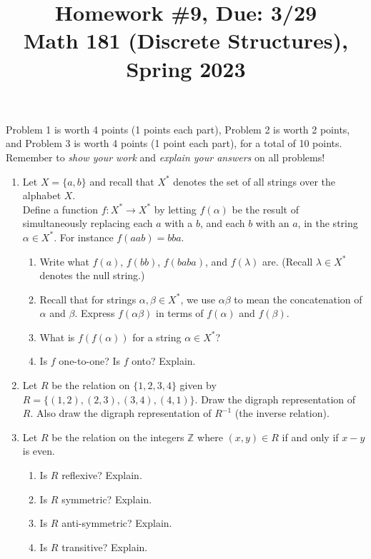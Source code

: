 \documentclass[11pt]{article}
\title{Homework \#9, Due: 3/29 \\Math 181 (Discrete Structures), Spring 2023}
\date{}
\begin{document}
\maketitle

\thispagestyle{empty}

\vspace{-1cm}

Problem 1 is worth 4 points (1 points each part), Problem 2 is worth 2 points, and Problem 3 is worth 4 points (1 point each part), for a total of 10 points. Remember to \emph{show your work} and \emph{explain your answers} on all problems!

\begin{enumerate}

\item Let $X=\{a,b\}$ and recall that $X^*$ denotes the set of all strings over the alphabet $X$. \\ Define a function $f\colon X^* \to X^*$ by letting $f(\alpha)$ be the result of simultaneously replacing each $a$ with a $b$, and each $b$ with an $a$, in the string $\alpha \in X^*$. For instance $f(aab) = bba$.
\begin{enumerate}
\item Write what $f(a)$, $f(bb)$, $f(baba)$, and $f(\lambda)$ are. (Recall $\lambda \in X^*$ denotes the null string.)
\item Recall that for strings $\alpha, \beta \in X^*$, we use $\alpha \beta$ to mean the concatenation of $\alpha$ and $\beta$. Express $f(\alpha\beta)$ in terms of $f(\alpha)$ and $f(\beta)$.
\item What is $f( f(\alpha))$ for a string $\alpha\in X^*$?
\item Is $f$ one-to-one? Is $f$ onto? Explain.
\end{enumerate}

\item Let $R$ be the relation on $\{1,2,3,4\}$ given by $R = \{(1,2),(2,3),(3,4),(4,1)\}$. Draw the digraph representation of $R$. Also draw the digraph representation of $R^{-1}$ (the inverse relation).

\item Let $R$ be the relation on the integers $\mathbb{Z}$ where $(x,y) \in R$ if and only if $x-y$ is even.
\begin{enumerate}
\item Is $R$ reflexive? Explain.
\item Is $R$ symmetric? Explain.
\item Is $R$ anti-symmetric? Explain.
\item Is $R$ transitive? Explain.
\end{enumerate}

\end{enumerate}
\end{document}

